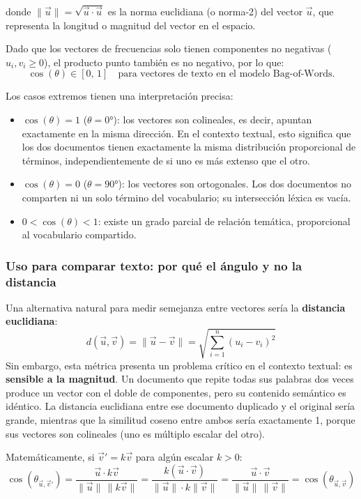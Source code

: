 donde $\|\vec{u}\| = \sqrt{\vec{u}\cdot\vec{u}}$ es la norma euclidiana (o norma-2) del vector $\vec{u}$, que representa la longitud o magnitud del vector en el espacio.

Dado que los vectores de frecuencias solo tienen componentes no negativas ($u_i, v_i \geq 0$), el producto punto también es no negativo, por lo que:
\[
\cos(\theta) \in [0,\, 1] \quad \text{para vectores de texto en el modelo Bag-of-Words.}
\]

Los casos extremos tienen una interpretación precisa:
\begin{itemize}
    \item $\cos(\theta) = 1$ ($\theta = 0°$): los vectores son colineales, es decir, apuntan exactamente en la misma dirección. En el contexto textual, esto significa que los dos documentos tienen exactamente la misma distribución proporcional de términos, independientemente de si uno es más extenso que el otro.
    \item $\cos(\theta) = 0$ ($\theta = 90°$): los vectores son ortogonales. Los dos documentos no comparten ni un solo término del vocabulario; su intersección léxica es vacía.
    \item $0 < \cos(\theta) < 1$: existe un grado parcial de relación temática, proporcional al vocabulario compartido.
\end{itemize}

\subsubsection{Uso para comparar texto: por qué el ángulo y no la distancia}

Una alternativa natural para medir semejanza entre vectores sería la \textbf{distancia euclidiana}:
\[
 d(\vec{u}, \vec{v}) = \|\vec{u} - \vec{v}\| = \sqrt{\sum_{i=1}^{n}(u_i - v_i)^2}
\]
Sin embargo, esta métrica presenta un problema crítico en el contexto textual: es \textbf{sensible a la magnitud}. Un documento que repite todas sus palabras dos veces produce un vector con el doble de componentes, pero su contenido semántico es idéntico. La distancia euclidiana entre ese documento duplicado y el original sería grande, mientras que la similitud coseno entre ambos sería exactamente 1, porque sus vectores son colineales (uno es múltiplo escalar del otro).

Matemáticamente, si $\vec{v}' = k\vec{v}$ para algún escalar $k > 0$:
\[
\cos(\theta_{\vec{u},\vec{v}'}) = \frac{\vec{u} \cdot k\vec{v}}{\|\vec{u}\|\,\|k\vec{v}\|} = \frac{k(\vec{u}\cdot\vec{v})}{\|\vec{u}\|\cdot k\|\vec{v}\|} = \frac{\vec{u}\cdot\vec{v}}{\|\vec{u}\|\,\|\vec{v}\|} = \cos(\theta_{\vec{u},\vec{v}})
\]


